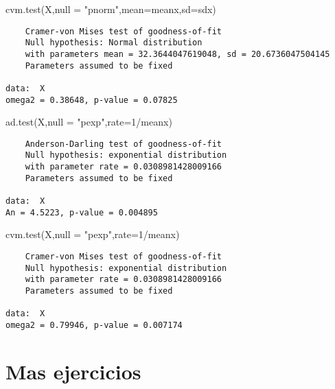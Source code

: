 \documentclass[
  a4paper,
  oneside,
  openany]{book}
\newenvironment{Shaded}{\begin{snugshade}}{\end{snugshade}}
\newcommand{\AttributeTok}[1]{\textcolor[rgb]{0.77,0.63,0.00}{#1}}
\newcommand{\DecValTok}[1]{\textcolor[rgb]{0.00,0.00,0.81}{#1}}
\newcommand{\FunctionTok}[1]{\textcolor[rgb]{0.00,0.00,0.00}{#1}}
\newcommand{\NormalTok}[1]{#1}
\newcommand{\SpecialCharTok}[1]{\textcolor[rgb]{0.00,0.00,0.00}{#1}}
\newcommand{\StringTok}[1]{\textcolor[rgb]{0.31,0.60,0.02}{#1}}
\begin{document}
\begin{Shaded}
\begin{Highlighting}[]
\FunctionTok{cvm.test}\NormalTok{(X,}\AttributeTok{null =} \StringTok{"pnorm"}\NormalTok{,}\AttributeTok{mean=}\NormalTok{meanx,}\AttributeTok{sd=}\NormalTok{sdx)}
\end{Highlighting}
\end{Shaded}

\begin{verbatim}
    Cramer-von Mises test of goodness-of-fit
    Null hypothesis: Normal distribution
    with parameters mean = 32.3644047619048, sd = 20.6736047504145
    Parameters assumed to be fixed

data:  X
omega2 = 0.38648, p-value = 0.07825
\end{verbatim}

\begin{Shaded}
\begin{Highlighting}[]
\FunctionTok{ad.test}\NormalTok{(X,}\AttributeTok{null =} \StringTok{"pexp"}\NormalTok{,}\AttributeTok{rate=}\DecValTok{1}\SpecialCharTok{/}\NormalTok{meanx)}
\end{Highlighting}
\end{Shaded}

\begin{verbatim}
    Anderson-Darling test of goodness-of-fit
    Null hypothesis: exponential distribution
    with parameter rate = 0.0308981428009166
    Parameters assumed to be fixed

data:  X
An = 4.5223, p-value = 0.004895
\end{verbatim}

\begin{Shaded}
\begin{Highlighting}[]
\FunctionTok{cvm.test}\NormalTok{(X,}\AttributeTok{null =} \StringTok{"pexp"}\NormalTok{,}\AttributeTok{rate=}\DecValTok{1}\SpecialCharTok{/}\NormalTok{meanx)}
\end{Highlighting}
\end{Shaded}

\begin{verbatim}
    Cramer-von Mises test of goodness-of-fit
    Null hypothesis: exponential distribution
    with parameter rate = 0.0308981428009166
    Parameters assumed to be fixed

data:  X
omega2 = 0.79946, p-value = 0.007174
\end{verbatim}

\hypertarget{mas-ejercicios}{%
\section{Mas ejercicios}\label{mas-ejercicios}}
\end{document}
